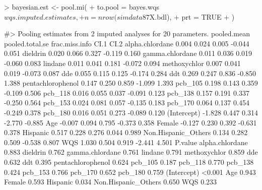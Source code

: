 \begin{Schunk}
\begin{Sinput}
> bayesian.est <- pool.mi(
+   to.pool = bayes.wqs$wqs.imputed.estimates, 
+   n = nrow(simdata87$X.bdl), 
+   prt = TRUE
+ )
\end{Sinput}
\begin{Soutput}
#> Pooling estimates from 2 imputed analyses for 20 parameters. 
                    pooled.mean pooled.total.se frac.miss.info   CI.1   CI.2
alpha.chlordane           0.004           0.024          0.005 -0.044  0.051
dieldrin                  0.020           0.066          0.327 -0.119  0.160
gamma.chlordane           0.011           0.036          0.019 -0.060  0.083
lindane                   0.011           0.041          0.181 -0.072  0.094
methoxychlor              0.007           0.041          0.019 -0.073  0.087
dde                       0.055           0.115          0.125 -0.174  0.284
ddt                       0.269           0.247          0.836 -0.850  1.388
pentachlorophenol         0.147           0.250          0.859 -1.099  1.393
pcb_105                   0.198           0.143          0.359 -0.109  0.506
pcb_118                   0.016           0.055          0.037 -0.091  0.123
pcb_138                   0.157           0.191          0.337 -0.250  0.564
pcb_153                   0.024           0.081          0.057 -0.135  0.183
pcb_170                   0.064           0.137          0.454 -0.249  0.378
pcb_180                   0.016           0.051          0.273 -0.089  0.120
(Intercept)              -1.828           0.447          0.314 -2.770 -0.885
Age                      -0.007           0.094          0.795 -0.373  0.358
Female                   -0.127           0.230          0.392 -0.631  0.378
Hispanic                  0.517           0.228          0.276  0.044  0.989
Non.Hispanic_Others       0.134           0.282          0.509 -0.538  0.807
WQS                       1.030           0.504          0.919 -2.441  4.501
                    P.value
alpha.chlordane       0.883
dieldrin              0.762
gamma.chlordane       0.761
lindane               0.791
methoxychlor          0.859
dde                   0.632
ddt                   0.395
pentachlorophenol     0.624
pcb_105               0.187
pcb_118               0.770
pcb_138               0.424
pcb_153               0.766
pcb_170               0.652
pcb_180               0.759
(Intercept)          <0.001
Age                   0.943
Female                0.593
Hispanic              0.034
Non.Hispanic_Others   0.650
WQS                   0.233
\end{Soutput}
\end{Schunk}

